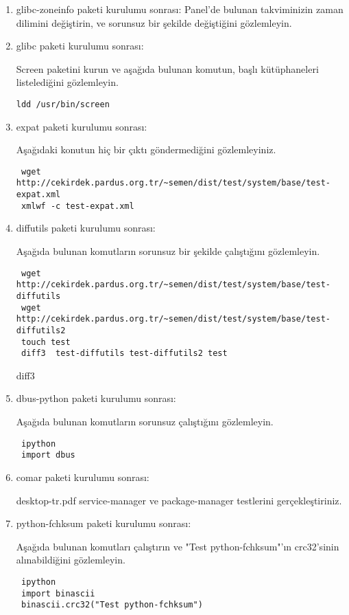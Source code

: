 \documentclass[a4paper,10pt]{article}
\begin{document}
\begin{enumerate}
\item glibc-zoneinfo paketi kurulumu sonrası:
Panel'de bulunan takviminizin zaman dilimini değiştirin, ve sorunsuz bir şekilde değiştiğini gözlemleyin.

\item glibc paketi kurulumu sonrası:

Screen paketini kurun ve aşağıda bulunan komutun, başlı kütüphaneleri listelediğini gözlemleyin.
\begin{verbatim}
ldd /usr/bin/screen 
\end{verbatim}

\item expat paketi kurulumu sonrası:

Aşağıdaki konutun hiç bir çıktı göndermediğini gözlemleyiniz.
\begin{verbatim}
 wget http://cekirdek.pardus.org.tr/~semen/dist/test/system/base/test-expat.xml
 xmlwf -c test-expat.xml
\end{verbatim}

\item diffutils paketi kurulumu sonrası:

Aşağıda bulunan komutların sorunsuz bir şekilde çalıştığını gözlemleyin.
\begin{verbatim}
 wget http://cekirdek.pardus.org.tr/~semen/dist/test/system/base/test-diffutils
 wget http://cekirdek.pardus.org.tr/~semen/dist/test/system/base/test-diffutils2
 touch test
 diff3  test-diffutils test-diffutils2 test 
\end{verbatim}

diff3 
\item dbus-python paketi kurulumu sonrası:

Aşağıda bulunan komutların sorunsuz çalıştığını gözlemleyin.
\begin{verbatim}
 ipython
 import dbus
\end{verbatim}


\item comar paketi kurulumu sonrası:

desktop-tr.pdf service-manager ve package-manager testlerini gerçekleştiriniz.
\item python-fchksum paketi kurulumu sonrası:

Aşağıda bulunan komutları çalıştırın ve "Test python-fchksum"'ın crc32'sinin alınabildiğini gözlemleyin.
\begin{verbatim}
 ipython
 import binascii
 binascii.crc32("Test python-fchksum")
\end{verbatim}


\end{enumerate}
\end{document}
